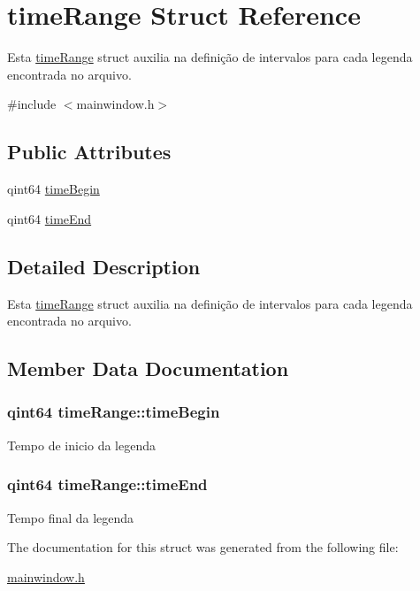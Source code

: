 \hypertarget{structtimeRange}{}\section{time\+Range Struct Reference}
\label{structtimeRange}


Esta \hyperlink{structtimeRange}{time\+Range} struct auxilia na definição de intervalos para cada legenda encontrada no arquivo.  




{\ttfamily \#include $<$mainwindow.\+h$>$}

\subsection*{Public Attributes}
\begin{DoxyCompactItemize}
\item 
qint64 \hyperlink{structtimeRange_a6155d9d43f5e0f233f5b69c4944585a2}{time\+Begin}
\item 
qint64 \hyperlink{structtimeRange_a289986776ea5e779100eb9ba782e8fd5}{time\+End}
\end{DoxyCompactItemize}


\subsection{Detailed Description}
Esta \hyperlink{structtimeRange}{time\+Range} struct auxilia na definição de intervalos para cada legenda encontrada no arquivo. 

\subsection{Member Data Documentation}
\hypertarget{structtimeRange_a6155d9d43f5e0f233f5b69c4944585a2}{}
\subsubsection[{time\+Begin}]{\setlength{\rightskip}{0pt plus 5cm}qint64 time\+Range\+::time\+Begin}\label{structtimeRange_a6155d9d43f5e0f233f5b69c4944585a2}
Tempo de inicio da legenda \hypertarget{structtimeRange_a289986776ea5e779100eb9ba782e8fd5}{}
\subsubsection[{time\+End}]{\setlength{\rightskip}{0pt plus 5cm}qint64 time\+Range\+::time\+End}\label{structtimeRange_a289986776ea5e779100eb9ba782e8fd5}
Tempo final da legenda 

The documentation for this struct was generated from the following file\+:\begin{DoxyCompactItemize}
\item 
\hyperlink{mainwindow_8h}{mainwindow.\+h}\end{DoxyCompactItemize}
